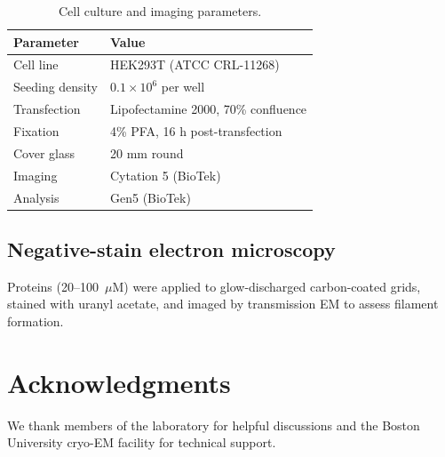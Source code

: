 \documentclass[11pt,a4paper]{article}
\begin{document}
\begin{table}[htbp]
\centering
\caption{Cell culture and imaging parameters.}
\label{tab:cell_params}
\begin{tabular}{ll}
\toprule
\textbf{Parameter} & \textbf{Value} \\
\midrule
Cell line & HEK293T (ATCC CRL-11268) \\
Seeding density & $0.1 \times 10^6$ per well \\
Transfection & Lipofectamine 2000, 70\% confluence \\
Fixation & 4\% PFA, 16 h post-transfection \\
Cover glass & 20 mm round \\
Imaging & Cytation 5 (BioTek) \\
Analysis & Gen5 (BioTek) \\
\bottomrule
\end{tabular}
\end{table}

\subsection{Negative-stain electron microscopy}
Proteins (20--100~$\mu$M) were applied to glow-discharged carbon-coated grids, stained with uranyl acetate, and imaged by transmission EM to assess filament formation.

\section*{Acknowledgments}
We thank members of the laboratory for helpful discussions and the Boston University cryo-EM facility for technical support.


\end{document}
